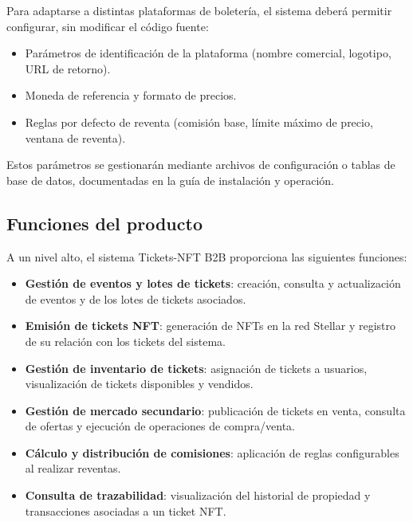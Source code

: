 \documentclass[12pt,letterpaper]{article}
\begin{document}
Para adaptarse a distintas plataformas de boletería, el sistema deberá permitir
configurar, sin modificar el código fuente:

\begin{itemize}
    \item Parámetros de identificación de la plataforma (nombre comercial,
          logotipo, URL de retorno).
    \item Moneda de referencia y formato de precios.
    \item Reglas por defecto de reventa (comisión base, límite máximo de
          precio, ventana de reventa).
\end{itemize}

Estos parámetros se gestionarán mediante archivos de configuración o tablas de
base de datos, documentadas en la guía de instalación y operación.

\subsection{Funciones del producto}

A un nivel alto, el sistema Tickets-NFT B2B proporciona las siguientes funciones:

\begin{itemize}
    \item \textbf{Gestión de eventos y lotes de tickets}: creación, consulta y
          actualización de eventos y de los lotes de tickets asociados.
    \item \textbf{Emisión de tickets NFT}: generación de NFTs en la red
          Stellar y registro de su relación con los tickets del sistema.
    \item \textbf{Gestión de inventario de tickets}: asignación de tickets a
          usuarios, visualización de tickets disponibles y vendidos.
    \item \textbf{Gestión de mercado secundario}: publicación de tickets en
          venta, consulta de ofertas y ejecución de operaciones de
          compra/venta.
    \item \textbf{Cálculo y distribución de comisiones}: aplicación de reglas
          configurables al realizar reventas.
    \item \textbf{Consulta de trazabilidad}: visualización del historial de
          propiedad y transacciones asociadas a un ticket NFT.
\end{itemize}
\end{document}
